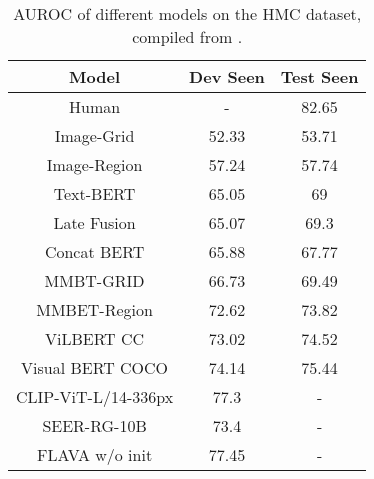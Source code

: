\documentclass[11pt]{article}
\begin{document}
\begin{table}[h]
\centering
\begin{tabular}{|c|c|c|}
\hline
  \textbf{Model} &
  \textbf{Dev Seen} &
  \textbf{Test Seen} \\
\hline
Human                                      & -              & 82.65          \\
Image-Grid                                 & 52.33          & 53.71          \\
Image-Region                               & 57.24          & 57.74          \\
Text-BERT                                  & 65.05          & 69             \\
Late Fusion                                & 65.07          & 69.3           \\
Concat BERT                                & 65.88          & 67.77          \\
MMBT-GRID                                  & 66.73          & 69.49          \\
MMBET-Region                               & 72.62          & 73.82          \\
ViLBERT CC                                 & 73.02          & 74.52          \\
Visual BERT COCO                           & 74.14          & 75.44          \\
CLIP-ViT-L/14-336px  & 77.3           & -              \\
SEER-RG-10B           & 73.4           & -              \\
FLAVA w/o init      & 77.45          & -              \\
\hline
\end{tabular}
\caption{AUROC of different models on the HMC dataset, compiled from \citet{kiela2020hateful, goyal2022vision, singh2021flava}.}
\label{tab:result-fb-compiled}
\end{table}
\end{document}
